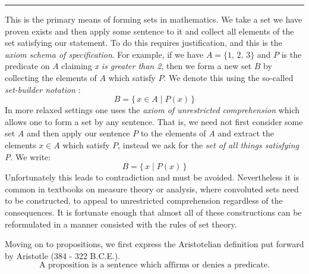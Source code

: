             \hrule\par\hfill\par
            This is the primary means of forming sets in mathematics. We take a
            set we have proven exists and then apply some sentence to it and
            collect all elements of the set satisfying our statement. To do
            this requires justification, and this is the
            \textit{axiom schema of specification}. For example, if we have
            $A=\{1,\,2,\,3\}$ and $P$ is the predicate on $A$ claiming
            \textit{x is greater than 2}, then we form a new set $B$ by
            collecting the elements of $A$ which satisfy $P$. We denote this
            using the so-called
            \textit{set-builder notation}%
            :
            \begin{equation}
                B=\{\,x\in{A}\;|\;P(x)\,\}
            \end{equation}
            In more relaxed settings one uses the \textit{axiom of unrestricted}
            \textit{comprehension} which
            allows one to form a set by any sentence. That is, we need not first
            consider some set $A$ and then apply our sentence $P$ to the elements of
            $A$ and extract the elements $x\in{A}$ which satisfy $P$, instead we
            ask for the \textit{set of all things satisfying P}. We write:
            \begin{equation}
                B=\{\,x\;|\;P(x)\,\}
            \end{equation}
            Unfortunately this leads to contradiction and must be avoided.
            Nevertheless it is common in textbooks on measure theory or
            analysis, where convoluted sets need to be constructed, to appeal
            to unrestricted comprehension regardless of the consequences. It is
            fortunate enough that almost all of these constructions can be
            reformulated in a manner consisted with the rules of set theory.
            \par\hfill\par
            Moving on to propositions, we first express the Aristotelian
            definition put forward by Aristotle
            (384 - 322 B.C.E.).
            \begin{equation}
                \text{A proposition is a sentence which affirms or denies a }
                \text{predicate.}
            \end{equation}
